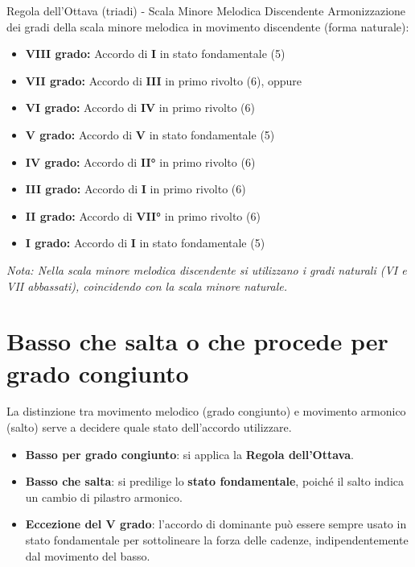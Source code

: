 \begin{regola}{Regola dell'Ottava (triadi) - Scala Minore Melodica Discendente}
	\label{reg:regola_ottava_melodica_disc}
	Armonizzazione dei gradi della scala minore melodica in movimento discendente (forma naturale):
	
	\begin{itemize}
		\item \textbf{VIII grado:} Accordo di \textbf{I} in stato fondamentale (5)
		\item \textbf{VII grado:} Accordo di \textbf{III} in primo rivolto (6), oppure 
		\item \textbf{VI grado:} Accordo di \textbf{IV} in primo rivolto (6)
		\item \textbf{V grado:} Accordo di \textbf{V} in stato fondamentale (5)
		\item \textbf{IV grado:} Accordo di \textbf{II°} in primo rivolto (6)
		\item \textbf{III grado:} Accordo di \textbf{I} in primo rivolto (6)
		\item \textbf{II grado:} Accordo di \textbf{VII°} in primo rivolto (6)
		\item \textbf{I grado:} Accordo di \textbf{I} in stato fondamentale (5)
	\end{itemize}
	
	\textit{Nota: Nella scala minore melodica discendente si utilizzano i gradi naturali (VI e VII abbassati), coincidendo con la scala minore naturale.}
\end{regola}


\section{Basso che salta o che procede per grado congiunto}
\label{sec:basso_salti_gradi}

La distinzione tra movimento melodico (grado congiunto) e movimento armonico (salto) serve a decidere quale stato dell'accordo utilizzare.

\begin{regola}
	\label{reg:stato_basso}
	\begin{itemize}
		\item \textbf{Basso per grado congiunto}: si applica la \textbf{Regola dell'Ottava}.
		\item \textbf{Basso che salta}: si predilige lo \textbf{stato fondamentale}, poiché il salto indica un cambio di pilastro armonico.
		\item \textbf{Eccezione del V grado}: l'accordo di dominante può essere sempre usato in stato fondamentale per sottolineare la forza delle cadenze, indipendentemente dal movimento del basso.
	\end{itemize}
\end{regola}

